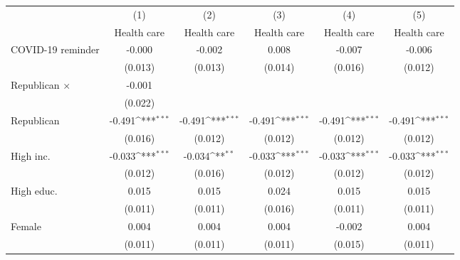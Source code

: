{
\def\sym#1{\ifmmode^{#1}\else\(^{#1}\)\fi}
\begin{tabular}{l*{5}{c}}
\toprule
                    &\multicolumn{1}{c}{(1)}&\multicolumn{1}{c}{(2)}&\multicolumn{1}{c}{(3)}&\multicolumn{1}{c}{(4)}&\multicolumn{1}{c}{(5)}\\
                    &\multicolumn{1}{c}{Health care}&\multicolumn{1}{c}{Health care}&\multicolumn{1}{c}{Health care}&\multicolumn{1}{c}{Health care}&\multicolumn{1}{c}{Health care}\\
\midrule
COVID-19 reminder   &      -0.000         &      -0.002         &       0.008         &      -0.007         &      -0.006         \\
                    &     (0.013)         &     (0.013)         &     (0.014)         &     (0.016)         &     (0.012)         \\
\addlinespace
Republican $\times$ &      -0.001         &                     &                     &                     &                     \\
                    &     (0.022)         &                     &                     &                     &                     \\
\addlinespace
Republican          &      -0.491\sym{***}&      -0.491\sym{***}&      -0.491\sym{***}&      -0.491\sym{***}&      -0.491\sym{***}\\
                    &     (0.016)         &     (0.012)         &     (0.012)         &     (0.012)         &     (0.012)         \\
\addlinespace
High inc.           &      -0.033\sym{***}&      -0.034\sym{**} &      -0.033\sym{***}&      -0.033\sym{***}&      -0.033\sym{***}\\
                    &     (0.012)         &     (0.016)         &     (0.012)         &     (0.012)         &     (0.012)         \\
\addlinespace
High educ.          &       0.015         &       0.015         &       0.024         &       0.015         &       0.015         \\
                    &     (0.011)         &     (0.011)         &     (0.016)         &     (0.011)         &     (0.011)         \\
\addlinespace
Female              &       0.004         &       0.004         &       0.004         &      -0.002         &       0.004         \\
                    &     (0.011)         &     (0.011)         &     (0.011)         &     (0.015)         &     (0.011)         \\

\end{tabular}}
